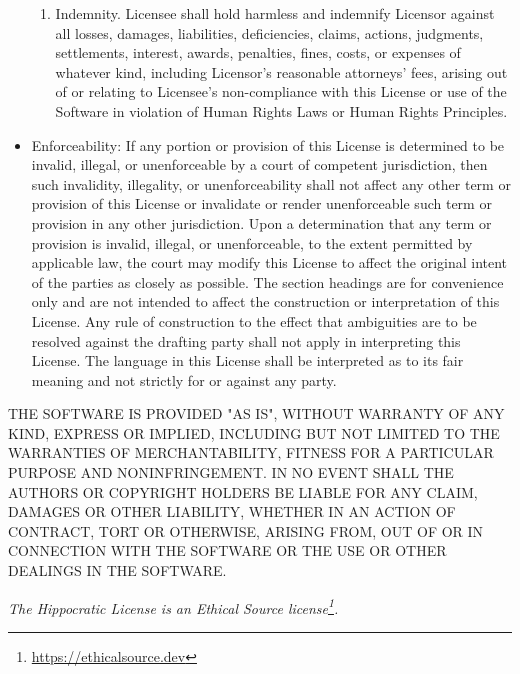 \documentclass[krantzl]{krantz}
\newcommand{\hreffoot}[2]{{#1}\footnote{\href{#2}{#2}}}
\begin{document}
\begin{itemize}
\begin{enumerate}
\item 

Indemnity. Licensee shall hold harmless and indemnify Licensor against
    all losses, damages, liabilities, deficiencies, claims, actions,
    judgments, settlements, interest, awards, penalties, fines, costs, or
    expenses of whatever kind, including Licensor's reasonable attorneys'
    fees, arising out of or relating to Licensee's non-compliance with this
    License or use of the Software in violation of Human Rights Laws or
    Human Rights Principles.



\end{enumerate}



\item 

Enforceability: If any portion or provision of this License is determined to
     be invalid, illegal, or unenforceable by a court of competent jurisdiction,
     then such invalidity, illegality, or unenforceability shall not affect any
     other term or provision of this License or invalidate or render
     unenforceable such term or provision in any other jurisdiction. Upon a
     determination that any term or provision is invalid, illegal, or
     unenforceable, to the extent permitted by applicable law, the court may
     modify this License to affect the original intent of the parties as closely
     as possible. The section headings are for convenience only and are not
     intended to affect the construction or interpretation of this License. Any
     rule of construction to the effect that ambiguities are to be resolved
     against the drafting party shall not apply in interpreting this
     License. The language in this License shall be interpreted as to its fair
     meaning and not strictly for or against any party.



\end{itemize}


THE SOFTWARE IS PROVIDED "AS IS", WITHOUT WARRANTY OF ANY KIND, EXPRESS OR
IMPLIED, INCLUDING BUT NOT LIMITED TO THE WARRANTIES OF MERCHANTABILITY, FITNESS
FOR A PARTICULAR PURPOSE AND NONINFRINGEMENT. IN NO EVENT SHALL THE AUTHORS OR
COPYRIGHT HOLDERS BE LIABLE FOR ANY CLAIM, DAMAGES OR OTHER LIABILITY, WHETHER
IN AN ACTION OF CONTRACT, TORT OR OTHERWISE, ARISING FROM, OUT OF OR IN
CONNECTION WITH THE SOFTWARE OR THE USE OR OTHER DEALINGS IN THE SOFTWARE.


\emph{The Hippocratic License is an \hreffoot{Ethical Source license}{https://ethicalsource.dev}.}
\end{document}
